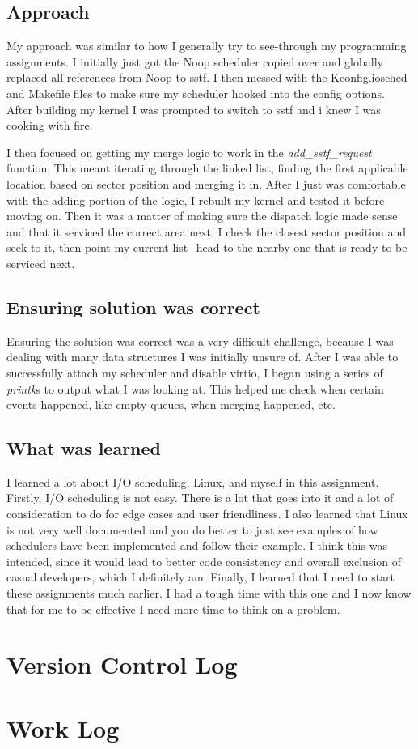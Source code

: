\documentclass[10pt,draftclsnofoot,onecolumn]{IEEEtran}
\begin{document}
\subsection{Approach}
\par My approach was similar to how I generally try to see-through my programming assignments.
I initially just got the Noop scheduler copied over and globally replaced all references from Noop to sstf.
I then messed with the Kconfig.iosched and Makefile files to make sure my scheduler hooked into the config options.
After building my kernel I was prompted to switch to sstf and i knew I was cooking with fire.

\par I then focused on getting my merge logic to work in the \textit{add\_sstf\_request} function.
This meant iterating through the linked list, finding the first applicable location based on sector position and merging it in.
After I just was comfortable with the adding portion of the logic, I rebuilt my kernel and tested it before moving on.
Then it was a matter of making sure the dispatch logic made sense and that it serviced the correct area next.
I check the closest sector position and seek to it, then point my current list\_head to the nearby one that is ready to be serviced next.

\subsection{Ensuring solution was correct}
Ensuring the solution was correct was a very difficult challenge, because I was dealing with many data structures I was initially unsure of.
After I was able to successfully attach my scheduler and disable virtio, I began using a series of \textit{printk}s to output what I was looking at.
This helped me check when certain events happened, like empty queues, when merging happened, etc.

\subsection{What was learned}
I learned a lot about I/O scheduling, Linux, and myself in this assignment.
Firstly, I/O scheduling is not easy.
There is a lot that goes into it and a lot of consideration to do for edge cases and user friendliness.
I also learned that Linux is not very well documented and you do better to just see examples of how schedulers have been implemented and follow their example.
I think this was intended, since it would lead to better code consistency and overall exclusion of casual developers, which I definitely am.
Finally, I learned that I need to start these assignments much earlier.
I had a tough time with this one and I now know that for me to be effective I need more time to think on a problem.

\section{Version Control Log}


\section{Work Log}

\end{document}
